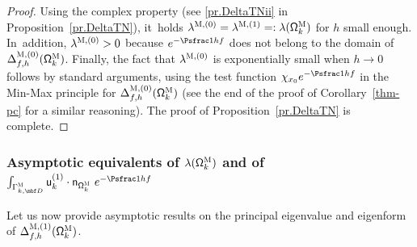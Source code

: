 \begin{proof}
Using the complex property (see \eqref{pr.DeltaTNii}
in Proposition~\ref{pr.DeltaTN}), it~holds $\lambda^{\textsc{M},
(0)}=\lambda^{\textsc{M}, (1)}=:\lambda(\mathsf \Omega_k^{\textsc{M}})$ for $h$ small enough. In~addition,
$\lambda^{\textsc{M}, (0)}>0$ because $e^{-\Psfrac 1hf}$ does not belong
to the domain of $\Delta_{f,h}^{\textsc{M},(0)}(\mathsf
\Omega_k^{\textsc{M}})$. Finally, the fact that $\lambda^{\textsc{M}, (0)}$ is exponentially
small when $h\to 0$ follows by standard arguments, using the test
function $\chi_{x_0} e^{-\Psfrac 1hf}$ in the Min-Max principle for
$\Delta_{f,h}^{\textsc{M},(0)}(\mathsf \Omega_k^{\textsc{M}})$ (see
the end of the proof of Corollary~\ref{thm-pc} for a similar reasoning). The proof of Proposition~\ref{pr.DeltaTN} is complete. \end{proof}

\subsubsection{Asymptotic equivalents of $\lambda(\mathsf
\Omega_k^{\textsc{M}})$ and of $\int_{\Gamma_{k,\mbf
D}^{\textsc{M}}}\mathsf u^{(1)}_k \cdot \mathsf n_{ \mathsf
\Omega_k^{\textsc{M}} }\ e^{-\Psfrac 1hf}$}\label{sec.equivM}

Let us now provide asymptotic results on the principal eigenvalue and
eigenform of $ \Delta_{f,h}^{\textsc{M},(1)} (\mathsf \Omega_k^{\textsc{M}}) $.

